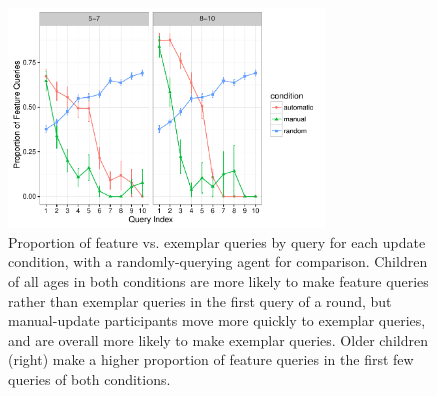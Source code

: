 \documentclass[man,floatsintext]{apa6}
\begin{document}
\begin{figure}[t] %
  \centering
  \includegraphics[width=0.75\textwidth]{figures/proportion_feat_queries_by_click} %
  \vspace{-.1cm}
  \caption{Proportion of feature vs. exemplar queries by query for each update condition, with a randomly-querying agent for comparison. Children of all ages in both conditions are more likely to make feature queries rather than 
exemplar queries in the first query of a round, but manual-update participants 
move more quickly to exemplar queries, and are overall more likely to make 
exemplar queries. Older children (right) make a higher proportion of feature queries in the first few queries of both conditions.}
  \label{fig:query-prop-click}
  \vspace{-.1cm}
\end{figure} 
\end{document}
